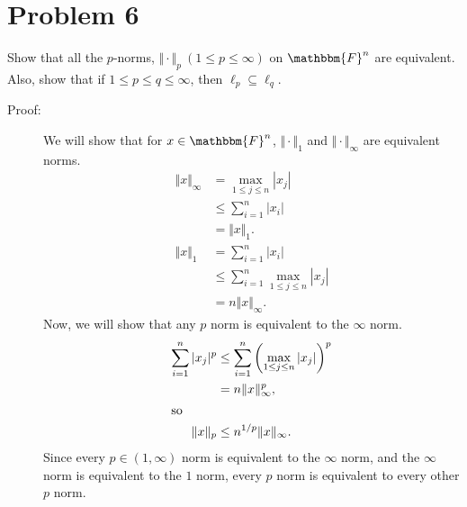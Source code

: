 \documentclass[10pt]{extarticle}
\begin{document}
  \section{Problem 6}%
  Show that all the $p$-norms, $\Vert \cdot \Vert_p~(1\leq p \leq \infty)$ on $\mathbbm{F}^n$ are equivalent. Also, show that if $1\leq p \leq q \leq \infty$, then $\ell_p \subseteq \ell_q$.
  \begin{description}
    \item[Proof:] We will show that for $x\in \mathbbm{F}^n$, $\Vert \cdot \Vert_1$ and $\Vert \cdot \Vert_{\infty}$ are equivalent norms.
      \begin{align*}
        \Vert x \Vert_{\infty} &= \max_{1\leq j \leq n}|x_j|\\
                               &\leq \sum_{i=1}^{n}|x_i|\\
                               &= \Vert x \Vert_1.\\
        \Vert x \Vert_{1} &= \sum_{i=1}^{n}|x_i|\\
                          &\leq \sum_{i=1}^{n}\max_{1\leq j \leq n}|x_j|\\
                          &= n\Vert x \Vert_{\infty}.
      \end{align*}
      Now, we will show that any $p$ norm is equivalent to the $\infty$ norm.
      \begin{align*}
        \sum_{i=1}^{n}|x_j|^p&\leq \sum_{i=1}^{n}\left(\max_{1\leq j\leq n}|x_j|\right)^p\\
                             &= n\Vert x\Vert_{\infty}^{p},\\
                             \shortintertext{so}
        \Vert x\Vert_{p} &\leq n^{1/p}\Vert x \Vert_{\infty}.
      \end{align*}
      Since every $p\in (1,\infty)$ norm is equivalent to the $\infty$ norm, and the $\infty$ norm is equivalent to the $1$ norm, every $p$ norm is equivalent to every other $p$ norm.
  \end{description}
\end{document}
